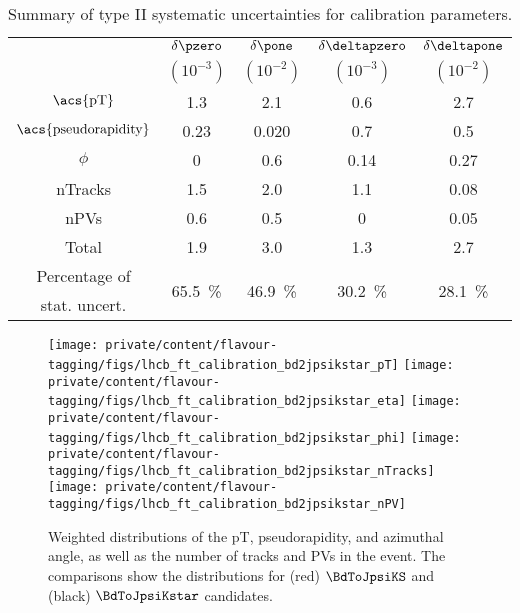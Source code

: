 \begin{table}
  \centering
  \caption{Summary of type II systematic uncertainties for \SSpi calibration
  parameters.}
  \label{tab:flavour_tagging:calibration:ss:systematics}
  \begin{tabular}{ccccc}
    \toprule
      & $\delta\pzero$ & $\delta\pone$ & $\delta\deltapzero$ & $\delta\deltapone$ \\
      & $(10^{-3})$    & $(10^{-2})$   & $(10^{-3})$         & $(10^{-2})$        \\
    \midrule
    $\text{\acs{pT}}$             & 1.3  & 2.1   & 0.6  & 2.7  \\
    $\text{\acs{pseudorapidity}}$ & 0.23 & 0.020 & 0.7  & 0.5  \\
    $\phi$                        & 0    & 0.6   & 0.14 & 0.27 \\
    nTracks                       & 1.5  & 2.0   & 1.1  & 0.08 \\
    nPVs                          & 0.6  & 0.5   & 0    & 0.05 \\
    \midrule
      Total                       & 1.9  & 3.0   & 1.3  & 2.7 \\
    \midrule
    Percentage of & 
    \multirow{2}[2]{*}{\SI{65.5}{\percent}} & 
    \multirow{2}[2]{*}{\SI{46.9}{\percent}} & 
    \multirow{2}[2]{*}{\SI{30.2}{\percent}} & 
    \multirow{2}[2]{*}{\SI{28.1}{\percent}} \\
    stat. uncert. \\
    \bottomrule
  \end{tabular}
\end{table}
%
\begin{figure}
  \centering
  \texttt{[image: private/content/flavour-tagging/figs/lhcb\_ft\_calibration\_bd2jpsikstar\_pT]}
  \texttt{[image: private/content/flavour-tagging/figs/lhcb\_ft\_calibration\_bd2jpsikstar\_eta]}
  \texttt{[image: private/content/flavour-tagging/figs/lhcb\_ft\_calibration\_bd2jpsikstar\_phi]}
  \texttt{[image: private/content/flavour-tagging/figs/lhcb\_ft\_calibration\_bd2jpsikstar\_nTracks]}
  \texttt{[image: private/content/flavour-tagging/figs/lhcb\_ft\_calibration\_bd2jpsikstar\_nPV]}
  \caption{Weighted distributions of the \Bmeson \ac{pT}, \ac{pseudorapidity},
  and azimuthal angle, as well as the number of tracks and \aclp{PV} in the
  event. The comparisons show the distributions for (red) $\BdToJpsiKS$ and
  (black) $\BdToJpsiKstar$ candidates.
  \cite{FT:RunI}}
  \label{fig:flavour_tagging:calibration:ss:parameter_distributions}
\end{figure}

